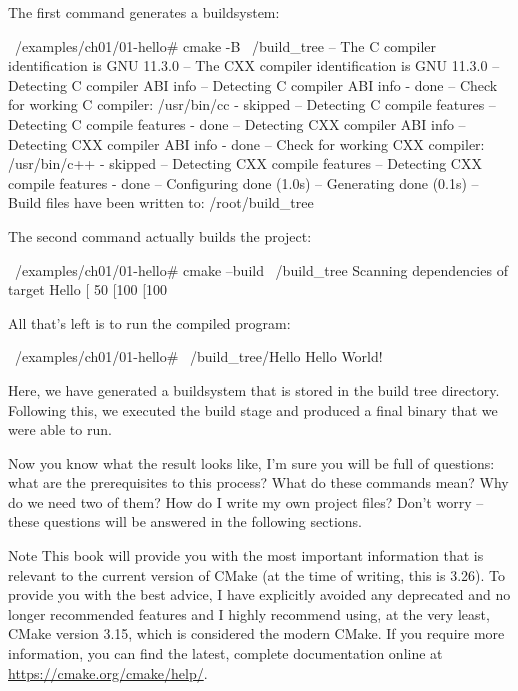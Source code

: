 The first command generates a buildsystem:

\begin{shell}
~/examples/ch01/01-hello# cmake -B ~/build_tree
-- The C compiler identification is GNU 11.3.0
-- The CXX compiler identification is GNU 11.3.0
-- Detecting C compiler ABI info
-- Detecting C compiler ABI info - done
-- Check for working C compiler: /usr/bin/cc - skipped
-- Detecting C compile features
-- Detecting C compile features - done
-- Detecting CXX compiler ABI info
-- Detecting CXX compiler ABI info - done
-- Check for working CXX compiler: /usr/bin/c++ - skipped
-- Detecting CXX compile features
-- Detecting CXX compile features - done
-- Configuring done (1.0s)
-- Generating done (0.1s)
-- Build files have been written to: /root/build_tree
\end{shell}

The second command actually builds the project:

\begin{shell}
~/examples/ch01/01-hello# cmake --build ~/build_tree
Scanning dependencies of target Hello
[ 50%
[100%
[100%
\end{shell}

All that’s left is to run the compiled program:

\begin{shell}
~/examples/ch01/01-hello# ~/build_tree/Hello
Hello World!
\end{shell}

Here, we have generated a buildsystem that is stored in the build tree directory. Following this, we executed the build stage and produced a final binary that we were able to run.

Now you know what the result looks like, I’m sure you will be full of questions: what are the prerequisites to this process? What do these commands mean? Why do we need two of them? How do I write my own project files? Don’t worry – these questions will be answered in the following sections.

\begin{myNotic}{Note}
This book will provide you with the most important information that is relevant to the current version of CMake (at the time of writing, this is 3.26). To provide you with the best advice, I have explicitly avoided any deprecated and no longer recommended features and I highly recommend using, at the very least, CMake version 3.15, which is considered the modern CMake. If you require more information, you can find the latest, complete documentation online at \url{https://cmake.org/cmake/help/}.
\end{myNotic}
















